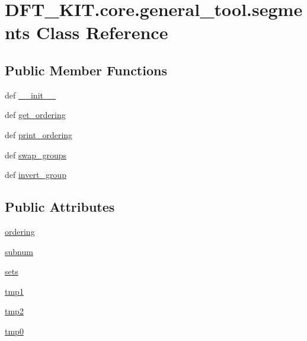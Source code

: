 \hypertarget{class_d_f_t___k_i_t_1_1core_1_1general__tool_1_1segments}{\section{D\+F\+T\+\_\+\+K\+I\+T.\+core.\+general\+\_\+tool.\+segments Class Reference}
\label{class_d_f_t___k_i_t_1_1core_1_1general__tool_1_1segments}
}
\subsection*{Public Member Functions}
\begin{DoxyCompactItemize}
\item 
def \hyperlink{class_d_f_t___k_i_t_1_1core_1_1general__tool_1_1segments_adfec2b28f9409ba7b437408fea8bc4d5}{\+\_\+\+\_\+init\+\_\+\+\_\+}
\item 
def \hyperlink{class_d_f_t___k_i_t_1_1core_1_1general__tool_1_1segments_a51ab40998b2deb1f02ac2520df449e53}{get\+\_\+ordering}
\item 
def \hyperlink{class_d_f_t___k_i_t_1_1core_1_1general__tool_1_1segments_a8d26485594d32ed90de52bc4928f821b}{print\+\_\+ordering}
\item 
def \hyperlink{class_d_f_t___k_i_t_1_1core_1_1general__tool_1_1segments_afbcfbca2cf664c5990d0ae83ef06d41d}{swap\+\_\+groups}
\item 
def \hyperlink{class_d_f_t___k_i_t_1_1core_1_1general__tool_1_1segments_a62a39fe2711a1f658e0940dcc8baa57a}{invert\+\_\+group}
\end{DoxyCompactItemize}
\subsection*{Public Attributes}
\begin{DoxyCompactItemize}
\item 
\hyperlink{class_d_f_t___k_i_t_1_1core_1_1general__tool_1_1segments_afa99d60924f0e9d5cf6ffb65086e1738}{ordering}
\item 
\hyperlink{class_d_f_t___k_i_t_1_1core_1_1general__tool_1_1segments_a31cec9678be9764616990406e3056d9a}{subnum}
\item 
\hyperlink{class_d_f_t___k_i_t_1_1core_1_1general__tool_1_1segments_a64d6f15485f3da291d97112c2ba36def}{sets}
\item 
\hyperlink{class_d_f_t___k_i_t_1_1core_1_1general__tool_1_1segments_a70f1faf836f9db631178da335a4f3679}{tmp1}
\item 
\hyperlink{class_d_f_t___k_i_t_1_1core_1_1general__tool_1_1segments_ab34ef602f88d29a1fa594154e1ed9d5d}{tmp2}
\item 
\hyperlink{class_d_f_t___k_i_t_1_1core_1_1general__tool_1_1segments_abb8c06dd79b8e5e9df52c9f30aa6af48}{tmp0}
\end{DoxyCompactItemize}


